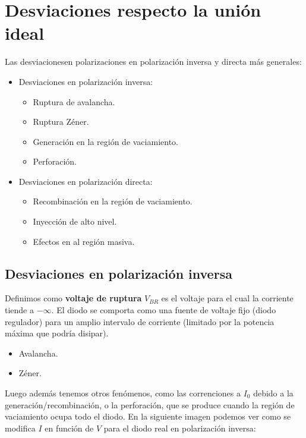 \section{Desviaciones respecto la unión ideal}

Las desviacionesen polarizaciones en polarización inversa y directa más generales: 

\begin{itemize}
    \item Desviaciones en polarización inversa:
    \begin{itemize}
        \item Ruptura de avalancha.
        \item Ruptura Zéner.
        \item Generación en la región de vaciamiento.
        \item Perforación.
    \end{itemize}
    \item Desviaciones en polarización directa: 
    \begin{itemize}
        \item Recombinación en la región de vaciamiento.
        \item Inyección de alto nivel.
        \item Efectos en al región masiva.
    \end{itemize}
\end{itemize}

\subsection{Desviaciones en polarización inversa}

Definimos como \textbf{voltaje de ruptura} $V_{BR}$ es el voltaje para el cual la corriente tiende a $-\infty$. El diodo se comporta como una fuente de voltaje fijo (diodo regulador) para un amplio intervalo de corriente (limitado por la potencia máxima que podría disipar). 

\begin{itemize}
    \item Avalancha.
    \item Zéner.
\end{itemize}
Luego además tenemos otros fenómenos, como las correnciones a $I_0$ debido a la generación/recombinación, o la perforación, que se produce cuando la región de vaciamiento ocupa todo el diodo. En la siguiente imagen podemos ver como se modifica $I$ en función de $V$ para el diodo real en polarización inversa: 


